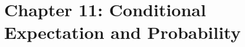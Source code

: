 \documentclass{lecturenotes}
\begin{document}
\section*{Chapter 11: Conditional Expectation and Probability}



%
%
%
%
%
%
%
%
\end{document}
